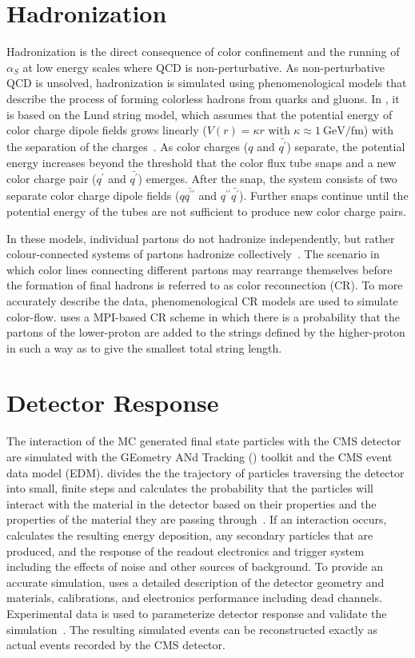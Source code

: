 \section{Hadronization}
Hadronization is the direct consequence of color confinement and the running of $\alpha_S$ at low energy scales where QCD is non-perturbative.
As non-perturbative QCD is unsolved, hadronization is simulated using phenomenological models that describe the process of forming colorless hadrons from quarks and gluons.
In \Pythia, it is based on the Lund string model, which assumes that the potential energy of color charge dipole fields grows linearly ($V(r) = \kappa r$ with $\kappa \approx \SI{1}{\GeV \per \femto \m}$) with the separation of the charges~\cite{SJOSTRAND2015159}.
As color charges ($q$ and $\bar{q^\prime}$) separate, the potential energy increases beyond the threshold that the color flux tube snaps and a new color charge pair ($q^\prime$ and $\bar{q^\prime}$) emerges.
After the snap, the system consists of two separate color charge dipole fields ($q\bar{q^{\prime\prime}}$ and $q^{\prime\prime}\bar{q^\prime}$).
Further snaps continue until the potential energy of the tubes are not sufficient to produce new color charge pairs.

In these models, individual partons do not hadronize independently, but rather colour-connected systems of partons hadronize collectively~\cite{BUCKLEY2011145}.
The scenario in which color lines connecting different partons may rearrange themselves before the formation of final hadrons is referred to as color reconnection (CR).
To more accurately describe the data, phenomenological CR models are used to simulate color-flow.
\Pythia uses a MPI-based CR scheme in which there is a probability that the partons of the lower-\pT proton are added to the strings defined by the higher-\pT proton in such a way as to give the smallest total string length.

\section{Detector Response}
The interaction of the MC generated final state particles with the CMS detector are simulated with the GEometry ANd Tracking (\Geant) toolkit and the CMS event data model (EDM).
\Geant divides the the trajectory of particles traversing the detector into small, finite steps and calculates the probability that the particles will interact with the material in the detector based on their properties and the properties of the material they are passing through~\cite{AGOSTINELLI2003250}.
If an interaction occurs, \Geant calculates the resulting energy deposition, any secondary particles that are produced, and the response of the readout electronics and trigger system including the effects of noise and other sources of background.
To provide an accurate simulation, \Geant uses a detailed description of the detector geometry and materials, calibrations, and electronics performance including dead channels.
Experimental data is used to parameterize detector response and validate the simulation~\cite{Bayatian:922757}.
The resulting simulated events can be reconstructed exactly as actual events recorded by the CMS detector.